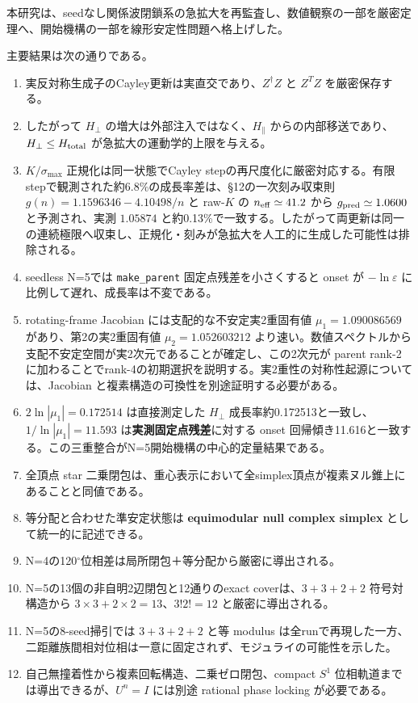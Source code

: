 \documentclass[
  a4paper,
]{ltjsarticle}
\providecommand{\tightlist}{%
  \setlength{\itemsep}{0pt}\setlength{\parskip}{0pt}}
\begin{document}
本研究は、seedなし関係波閉鎖系の急拡大を再監査し、数値観察の一部を厳密定理へ、開始機構の一部を線形安定性問題へ格上げした。

主要結果は次の通りである。

\begin{enumerate}
\def\labelenumi{\arabic{enumi}.}
\tightlist
\item
  実反対称生成子のCayley更新は実直交であり、\(Z^\dagger Z\) と \(Z^TZ\)
  を厳密保存する。
\item
  したがって \(H_\perp\) の増大は外部注入ではなく、\(H_\parallel\)
  からの内部移送であり、\(H_\perp\le H_{\rm total}\)
  が急拡大の運動学的上限を与える。
\item
  \(K/\sigma_{\max}\) 正規化は同一状態でCayley
  stepの再尺度化に厳密対応する。有限stepで観測された約6.8\%の成長率差は、§12の一次刻み収束則
  \(g(n)=1.1596346-4.10498/n\) と raw-\(K\) の \(n_{\rm eff}\simeq41.2\)
  から \(g_{\rm pred}\simeq1.0600\) と予測され、実測 \(1.05874\)
  と約0.13\%で一致する。したがって両更新は同一の連続極限へ収束し、正規化・刻みが急拡大を人工的に生成した可能性は排除される。
\item
  seedless N=5では \texttt{make\_parent} 固定点残差を小さくすると onset
  が \(-\ln\varepsilon\) に比例して遅れ、成長率は不変である。
\item
  rotating-frame Jacobian には支配的な不安定実2重固有値
  \(\mu_1=1.090086569\) があり、第2の実2重固有値 \(\mu_2=1.052603212\)
  より速い。数値スペクトルから支配不安定空間が実2次元であることが確定し、この2次元が
  parent rank-2
  に加わることでrank-4の初期選択を説明する。実2重性の対称性起源については、Jacobian
  と複素構造の可換性を別途証明する必要がある。
\item
  \(2\ln|\mu_1|=0.172514\) は直接測定した \(H_\perp\)
  成長率約0.172513と一致し、\(1/\ln|\mu_1|=11.593\)
  は\textbf{実測固定点残差}に対する onset
  回帰傾き11.616と一致する。この三重整合がN=5開始機構の中心的定量結果である。
\item
  全頂点 star
  二乗閉包は、重心表示において全simplex頂点が複素ヌル錐上にあることと同値である。
\item
  等分配と合わせた準安定状態は \textbf{equimodular null complex simplex}
  として統一的に記述できる。
\item
  N=4の120\(^\circ\)位相差は局所閉包＋等分配から厳密に導出される。
\item
  N=5の13個の非自明2辺閉包と12通りのexact coverは、\(3+3+2+2\)
  符号対構造から \(3\times3+2\times2=13\)、\(3!2!=12\)
  と厳密に導出される。
\item
  N=5の8-seed掃引では \(3+3+2+2\) と等 modulus
  は全runで再現した一方、二距離族間相対位相は一意に固定されず、モジュライの可能性を示した。
\item
  自己無撞着性から複素回転構造、二乗ゼロ閉包、compact \(S^1\)
  位相軌道までは導出できるが、\(U^n=I\) には別途 rational phase locking
  が必要である。
\end{enumerate}
\end{document}
